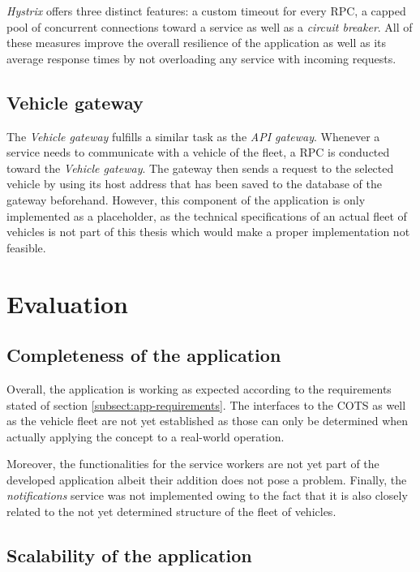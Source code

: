 \documentclass[12pt,a4paper,twoside]{report}
\begin{document}
\textit{Hystrix} offers three distinct features:
a custom timeout for every RPC, a capped pool of concurrent connections toward
a service as well as a \textit{circuit breaker}.
All of these measures improve the overall resilience of the application
as well as its average response times by not overloading any service with incoming
requests.


\section{Vehicle gateway}

The \textit{Vehicle gateway} fulfills a similar task as the \textit{API gateway}.
Whenever a service needs to communicate with a vehicle of the fleet, a RPC
is conducted toward the \textit{Vehicle gateway}. The gateway then sends a request
to the selected vehicle by using its host address that has been saved to the
database of the gateway beforehand.
However, this component of the application is only implemented as a placeholder,
as the technical specifications of an actual fleet of vehicles is not part
of this thesis which would make a proper implementation not feasible.



\chapter{Evaluation} \label{chap:evaluation}

\section{Completeness of the application}

Overall, the application is working as expected according to the requirements
stated of section \ref{subsect:app-requirements}.
The interfaces to the COTS as well as the vehicle fleet are not yet established
as those can only be determined when actually applying the concept to a real-world
operation.

Moreover, the functionalities for the service workers are not yet part
of the developed application albeit their addition does not pose a problem.
Finally, the \textit{notifications} service was not implemented owing to the
fact that it is also closely related to the not yet determined structure of the
fleet of vehicles.


\section{Scalability of the application}
\end{document}
